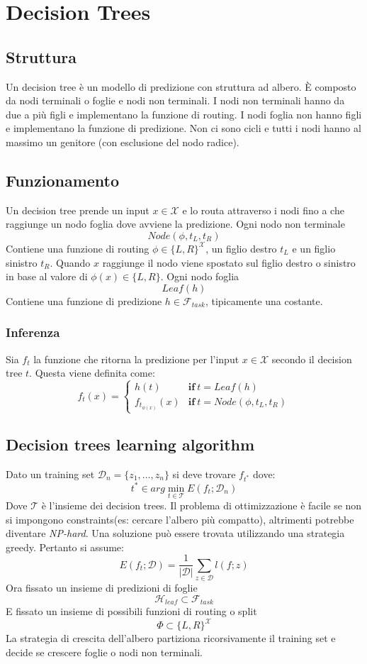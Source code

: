 \chapter{Decision Trees}

\section{Struttura}
Un decision tree \`e un modello di predizione con struttura ad albero.
\`E composto da nodi terminali o foglie e nodi non terminali.
I nodi non terminali hanno da due a pi\`u figli e implementano la funzione di routing.
I nodi foglia non hanno figli e implementano la funzione di predizione.
Non ci sono cicli e tutti i nodi hanno al massimo un genitore (con esclusione del nodo radice).

\section{Funzionamento}
Un decision tree prende un input $x\in\mathcal{X}$ e lo routa attraverso i nodi fino a che raggiunge un nodo foglia dove avviene la predizione.
Ogni nodo non terminale
$$Node(\phi, t_L, t_R)$$
Contiene una funzione di routing $\phi\in\{L, R\}^{\mathcal{X}}$, un figlio destro $t_L$ e un figlio sinistro $t_R$.
Quando $x$ raggiunge il nodo viene spostato sul figlio destro o sinistro in base al valore di $\phi(x)\in\{L,R\}$.
Ogni nodo foglia
$$Leaf(h)$$
Contiene una funzione di predizione $h\in\mathcal{F}_{task}$, tipicamente una costante.

	\subsection{Inferenza}
	Sia $f_t$ la funzione che ritorna la predizione per l'input $x\in\mathcal{X}$ secondo il decision tree $t$.
	Questa viene definita come:
	$$f_t(x)=\begin{cases}h(t)&\mathbf{if}\ t = Leaf(h)\\
										 f_{t_{\phi(x)}}(x)&\mathbf{if}\ t = Node(\phi, t_L, t_R)
				\end{cases}$$

\section{Decision trees learning algorithm}
Dato un training set $\mathcal{D}_n = \{z_1,\dots, z_n\}$ si deve trovare $f_{t^*}$ dove:
$$t^*\in arg\min\limits_{t\in\mathcal{T}} E(f_t;\mathcal{D}_n)$$
Dove $\mathcal{T}$ \`e l'insieme dei decision trees.
Il problema di ottimizzazione \`e facile se non si impongono constraints(es: cercare l'albero più compatto), altrimenti potrebbe diventare \emph{NP-hard}.
Una soluzione pu\`o essere trovata utilizzando una strategia greedy.
Pertanto si assume:
$$E(f_t;\mathcal{D}) = \dfrac{1}{|\mathcal{D}|}\sum\limits_{z\in\mathcal{D}}l(f;z)$$
Ora fissato un insieme di predizioni di foglie
$$\mathcal{H}_{leaf}\subset\mathcal{F}_{task}$$
E fissato un insieme di possibili funzioni di routing o split
$$\Phi\subset\{L,R\}^\mathcal{X}$$
La strategia di crescita dell'albero partiziona ricorsivamente il training set e decide se crescere foglie o nodi non terminali.

